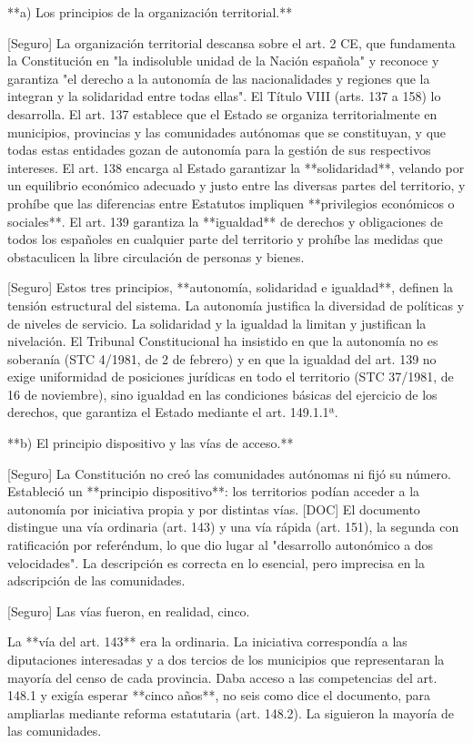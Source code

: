 \documentclass[10pt,a4paper]{article}
\begin{document}
**a) Los principios de la organización territorial.**

[Seguro] La organización territorial descansa sobre el art. 2 CE, que fundamenta la Constitución en "la indisoluble unidad de la Nación española" y reconoce y garantiza "el derecho a la autonomía de las nacionalidades y regiones que la integran y la solidaridad entre todas ellas". El Título VIII (arts. 137 a 158) lo desarrolla. El art. 137 establece que el Estado se organiza territorialmente en municipios, provincias y las comunidades autónomas que se constituyan, y que todas estas entidades gozan de autonomía para la gestión de sus respectivos intereses. El art. 138 encarga al Estado garantizar la **solidaridad**, velando por un equilibrio económico adecuado y justo entre las diversas partes del territorio, y prohíbe que las diferencias entre Estatutos impliquen **privilegios económicos o sociales**. El art. 139 garantiza la **igualdad** de derechos y obligaciones de todos los españoles en cualquier parte del territorio y prohíbe las medidas que obstaculicen la libre circulación de personas y bienes.

[Seguro] Estos tres principios, **autonomía, solidaridad e igualdad**, definen la tensión estructural del sistema. La autonomía justifica la diversidad de políticas y de niveles de servicio. La solidaridad y la igualdad la limitan y justifican la nivelación. El Tribunal Constitucional ha insistido en que la autonomía no es soberanía (STC 4/1981, de 2 de febrero) y en que la igualdad del art. 139 no exige uniformidad de posiciones jurídicas en todo el territorio (STC 37/1981, de 16 de noviembre), sino igualdad en las condiciones básicas del ejercicio de los derechos, que garantiza el Estado mediante el art. 149.1.1ª.

**b) El principio dispositivo y las vías de acceso.**

[Seguro] La Constitución no creó las comunidades autónomas ni fijó su número. Estableció un **principio dispositivo**: los territorios podían acceder a la autonomía por iniciativa propia y por distintas vías. [DOC] El documento distingue una vía ordinaria (art. 143) y una vía rápida (art. 151), la segunda con ratificación por referéndum, lo que dio lugar al "desarrollo autonómico a dos velocidades". La descripción es correcta en lo esencial, pero imprecisa en la adscripción de las comunidades.

[Seguro] Las vías fueron, en realidad, cinco.

La **vía del art. 143** era la ordinaria. La iniciativa correspondía a las diputaciones interesadas y a dos tercios de los municipios que representaran la mayoría del censo de cada provincia. Daba acceso a las competencias del art. 148.1 y exigía esperar **cinco años**, no seis como dice el documento, para ampliarlas mediante reforma estatutaria (art. 148.2). La siguieron la mayoría de las comunidades.
\end{document}
